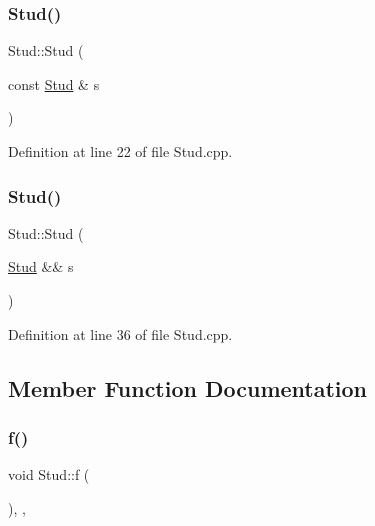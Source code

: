 \subsubsection{\texorpdfstring{Stud()}{Stud()}\hspace{0.1cm}{\footnotesize\ttfamily [3/4]}}
{\footnotesize\ttfamily Stud\+::\+Stud (\begin{DoxyParamCaption}\item[{const \mbox{\hyperlink{class_stud}{Stud}} \&}]{s }\end{DoxyParamCaption})}



Definition at line 22 of file Stud.\+cpp.

\mbox{\label{class_stud_a0dc47589ff92661e3bb7ea2070a4fd7d}} 
\subsubsection{\texorpdfstring{Stud()}{Stud()}\hspace{0.1cm}{\footnotesize\ttfamily [4/4]}}
{\footnotesize\ttfamily Stud\+::\+Stud (\begin{DoxyParamCaption}\item[{\mbox{\hyperlink{class_stud}{Stud}} \&\&}]{s }\end{DoxyParamCaption})\hspace{0.3cm}{\ttfamily [noexcept]}}



Definition at line 36 of file Stud.\+cpp.



\subsection{Member Function Documentation}
\mbox{\label{class_stud_a6ebf0056208a353346da33a779763e4f}} 
\subsubsection{\texorpdfstring{f()}{f()}}
{\footnotesize\ttfamily void Stud\+::f (\begin{DoxyParamCaption}{ }\end{DoxyParamCaption})\hspace{0.3cm}{\ttfamily [inline]}, {\ttfamily [override]}, {\ttfamily [virtual]}}



